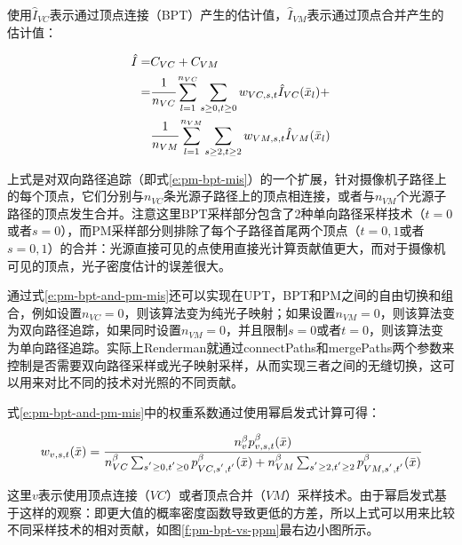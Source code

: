 使用$\hat{I}_{VC}$表示通过顶点连接（BPT）产生的估计值，$\hat{I}_{VM}$表示通过顶点合并产生的估计值：

\begin{equation}\label{e:pm-bpt-and-pm-mis}
\begin{aligned}	
	\hat{I}=&C_{VC}+C_{VM}\\
		   =& \cfrac{1}{n_{VC}}\sum^{n_{VC}}_{l=1}\sum_{s\geq 0,t\geq 0}w_{VC,s,t}\hat{I}_{VC}(\bar{x}_l)+\\
		   & \cfrac{1}{n_{VM}}\sum^{n_{VM}}_{l=1}\sum_{s\geq 2,t\geq 2}w_{VM,s,t}\hat{I}_{VM}(\bar{x}_l)
\end{aligned}
\end{equation}

上式是对双向路径追踪\cite{a:RobustMonteCarloMethodsforLightTransportSimulation}（即式\ref{e:pm-bpt-mis}）的一个扩展，针对摄像机子路径上的每个顶点，它们分别与$n_{VC}$条光源子路径上的顶点相连接，或者与$n_{VM}$个光源子路径的顶点发生合并。注意这里BPT采样部分包含了2种单向路径采样技术（$t=0$或者$s=0$），而PM采样部分则排除了每个子路径首尾两个顶点（$t=0,1$或者$s=0,1$）的合并：光源直接可见的点使用直接光计算贡献值更大，而对于摄像机可见的顶点，光子密度估计的误差很大。

通过式\ref{e:pm-bpt-and-pm-mis}还可以实现在UPT，BPT和PM之间的自由切换和组合，例如设置$n_{VC}=0$，则该算法变为纯光子映射；如果设置$n_{VM}=0$，则该算法变为双向路径追踪，如果同时设置$n_{VM}=0$，并且限制$s=0$或者$t=0$，则该算法变为单向路径追踪。实际上Renderman就通过connectPaths和mergePaths两个参数来控制是否需要双向路径采样或光子映射采样，从而实现三者之间的无缝切换，这可以用来对比不同的技术对光照的不同贡献。

式\ref{e:pm-bpt-and-pm-mis}中的权重系数通过使用幂启发式计算可得：

\begin{equation}\label{e:pm-vcm-weight}
	w_{v,s,t}(\bar{x})= \cfrac{n^{\beta}_vp^{\beta}_{v,s,t}(\bar{x})}{n^{\beta}_{VC}\sum_{s^{'}\geq 0,t^{'}\geq 0}p^{\beta}_{VC,s^{'},t^{'}}(\bar{x})+n^{\beta}_{VM}\sum_{s^{'}\geq 2,t^{'}\geq 2}p^{\beta}_{VM,s^{'},t^{'}}(\bar{x})}
\end{equation}

\noindent 这里$v$表示使用顶点连接（$VC$）或者顶点合并（$VM$）采样技术。由于幂启发式基于这样的观察：即更大值的概率密度函数导致更低的方差，所以上式可以用来比较不同采样技术的相对贡献，如图\ref{f:pm-bpt-vs-ppm}最右边小图所示。

